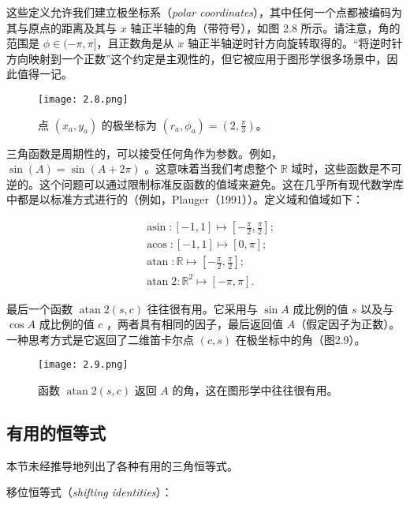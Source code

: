 \documentclass[lang=cn,12pt]{elegantbook}
\begin{document}
这些定义允许我们建立极坐标系（\textit{polar coordinates}），其中任何一个点都被编码为其与原点的距离及其与 $x$ 轴正半轴的角（带符号），如图 2.8 所示。请注意，角的范围是 $\phi\in(-\pi,\pi]$，且正数角是从 $x$ 轴正半轴逆时针方向旋转取得的。“将逆时针方向映射到一个正数”这个约定是主观性的，但它被应用于图形学很多场景中，因此值得一记。

\begin{figure}[htbp]
  \centering
  \texttt{[image: 2.8.png]}
  \caption{点 $(x_a,y_a)$ 的极坐标为 $(r_a,\phi_a)=(2,\frac{\pi}{3})$。}
\end{figure}

三角函数是周期性的，可以接受任何角作为参数。例如，$\sin(A) = \sin(A + 2\pi)$ 。这意味着当我们考虑整个 $\mathbb{R}$ 域时，这些函数是不可逆的。这个问题可以通过限制标准反函数的值域来避免。这在几乎所有现代数学库中都是以标准方式进行的（例如，Plauger（1991））。定义域和值域如下：

\begin{equation}
  \begin{aligned}
     & \operatorname{asin}:[-1,1] \mapsto[-\frac{\pi}{2}, \frac{\pi}{2}];      \\
     & \operatorname{acos}:[-1,1] \mapsto[0, \pi];                             \\
     & \operatorname{atan}: \mathbb{R} \mapsto[-\frac{\pi}{2}, \frac{\pi}{2}]; \\
     & \operatorname{atan} 2: \mathbb{R}^{2} \mapsto[-\pi, \pi].
  \end{aligned}
\end{equation}

最后一个函数 $\operatorname{atan}2(s,c)$ 往往很有用。它采用与 $\sin A$ 成比例的值 $s$ 以及与 $\cos A$ 成比例的值 $c$ ，两者具有相同的因子，最后返回值 $A$（假定因子为正数）。一种思考方式是它返回了二维笛卡尔点 $(c,s)$ 在极坐标中的角（图2.9）。

\begin{figure}[htbp]
  \centering
  \texttt{[image: 2.9.png]}
  \caption{函数 $\operatorname{atan}2(s,c)$ 返回 $A$ 的角，这在图形学中往往很有用。}
\end{figure}

\subsection{有用的恒等式}

本节未经推导地列出了各种有用的三角恒等式。

移位恒等式（\textit{shifting identities}）：
\end{document}
